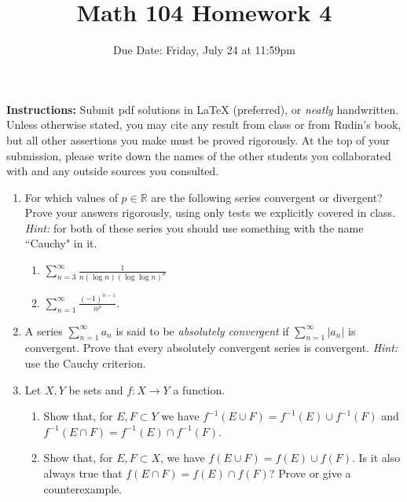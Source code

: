 \documentclass[12pt, letterpaper]{article}
\title{Math 104 Homework 4}
\author{Due Date: Friday, July 24 at 11:59pm}
\date{}
\newcommand{\0}{\mathbf{0}}
\newcommand{\1}{\mathbf{1}}
\begin{document}
\maketitle

\textbf{Instructions:} Submit pdf solutions in LaTeX (preferred), or \textit{neatly} handwritten. Unless otherwise stated, you may cite any result from class or from Rudin's book, but all other assertions you make must be proved rigorously. At the top of your submission, please write down the names of the other students you collaborated with and any outside sources you consulted.

\vspace{0.5cm}

\begin{enumerate}
    \item 
    For which values of $p \in \mathbb{R}$ are the following series convergent or divergent? Prove your answers rigorously, using only tests we explicitly covered in class. \textit{Hint:} for both of these series you should use something with the name ``Cauchy" in it.
    \begin{enumerate}
        \item 
        $\displaystyle{\sum_{n = 3}^{\infty} \frac{1}{n(\log n)(\log \log n)^p}}$\\

        \item 
        $\displaystyle{\sum_{n = 1}^{\infty}} \frac{(-1)^{n - 1}}{n^p}$.
    \end{enumerate}

    \vspace{0.5cm}

    \item 
    A series $\sum_{n = 1}^{\infty} a_n$ is said to be \textit{absolutely convergent} if $\sum_{n = 1}^{\infty} |a_n|$ is convergent. Prove that every absolutely convergent series is convergent. \textit{Hint:} use the Cauchy criterion.
    
    \vspace{0.5cm}

    \item 
    Let $X, Y$ be sets and $f : X \to Y$ a function.
    \begin{enumerate}
        \item 
        Show that, for $E, F \subset Y$ we have $f^{-1}(E \cup F) = f^{-1}(E) \cup f^{-1}(F)$ and $f^{-1}(E \cap F) = f^{-1}(E) \cap f^{-1}(F)$.

        \item 
        Show that, for $E, F \subset X$, we have $f(E \cup F) = f(E) \cup f(F)$. Is it also always true that $f(E \cap F) = f(E) \cap f(F)$? Prove or give a counterexample.


\end{enumerate}
\end{enumerate}
\end{document}
